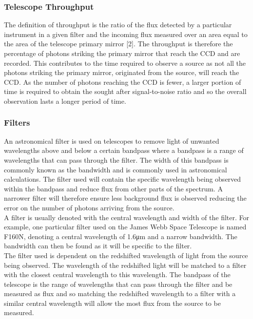 \documentclass[pdf,color]{UoBnote}
\begin{document}
\subsubsection{Telescope Throughput}
The definition of throughput is the ratio of the flux detected by a particular instrument in a given filter and the incoming flux measured over an area equal to the area of the telescope primary mirror [2]. The throughput is therefore the percentage of photons striking the primary mirror that reach the CCD and are recorded. This contributes to the time required to observe a source as not all the photons striking the primary mirror, originated from the source, will reach the CCD. As the number of photons reaching the CCD is fewer, a larger portion of time is required to obtain the sought after signal-to-noise ratio and so the overall observation lasts a longer period of time.

\subsubsection{Filters}
An astronomical filter is used on telescopes to remove light of unwanted wavelengths above and below a certain bandpass where a bandpass is a range of wavelengths that can pass through the filter. The width of this bandpass is commonly known as the bandwidth and is commonly used in astronomical calculations. The filter used will contain the specific wavelength being observed within the bandpass and reduce flux from other parts of the spectrum. A narrower filter will therefore ensure less background flux is observed reducing the error on the number of photons arriving from the source.\\
\newline
A filter is usually denoted with the central wavelength and width of the filter. For example, one particular filter used on the James Webb Space Telescope is named F160N, denoting a central wavelength of 1.6μm and a narrow bandwidth. The bandwidth can then be found as it will be specific to the filter. \\
\newline
The filter used is dependent on the redshifted wavelength of light from the source being observed. The wavelength of the redshifted light will be matched to a filter with the closest central wavelength to this wavelength. The bandpass of the telescope is the range of wavelengths that can pass through the filter and be measured as flux and so matching the redshifted wavelength to a filter with a similar central wavelength will allow the most flux from the source to be measured. 
\end{document}
